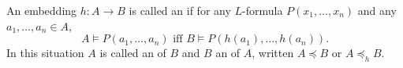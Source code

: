 An embedding $h: A \rightarrow B$ is called an  if for any $L$-formula $P(x_1, \ldots, x_n)$ and any $a_1, \ldots, a_n \in A$,
$$A \vDash P(a_1, \ldots, a_n) \text{ iff } B \vDash P(h(a_1), \ldots, h(a_n)).$$
In this situation $A$ is called an  of $B$ and $B$ an  of $A$, written $A \preceq B$ or $A \preceq_h B$.

